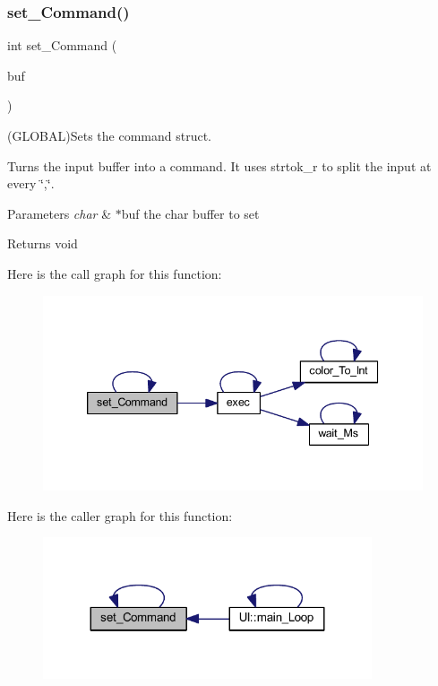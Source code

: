 \subsubsection{\texorpdfstring{set\+\_\+\+Command()}{set\_Command()}}
{\footnotesize\ttfamily int set\+\_\+\+Command (\begin{DoxyParamCaption}\item[{char $\ast$}]{buf }\end{DoxyParamCaption})}



(G\+L\+O\+B\+AL)Sets the command struct. 

Turns the input buffer into a command. It uses strtok\+\_\+r to split the input at every \char`\"{},\char`\"{}.


\begin{DoxyParams}{Parameters}
{\em char} & $\ast$buf the char buffer to set \\
\hline
\end{DoxyParams}
\begin{DoxyReturn}{Returns}
void 
\end{DoxyReturn}
Here is the call graph for this function\+:\nopagebreak
\begin{figure}[H]
\begin{center}
\leavevmode
\includegraphics[width=339pt]{namespace_l_l_a487e020844f801061abc930461b1ff2b_cgraph}
\end{center}
\end{figure}
Here is the caller graph for this function\+:\nopagebreak
\begin{figure}[H]
\begin{center}
\leavevmode
\includegraphics[width=275pt]{namespace_l_l_a487e020844f801061abc930461b1ff2b_icgraph}
\end{center}
\end{figure}
\mbox{\label{namespace_l_l_a5e66446caf21dd90191dc07a13ce2378}} 
